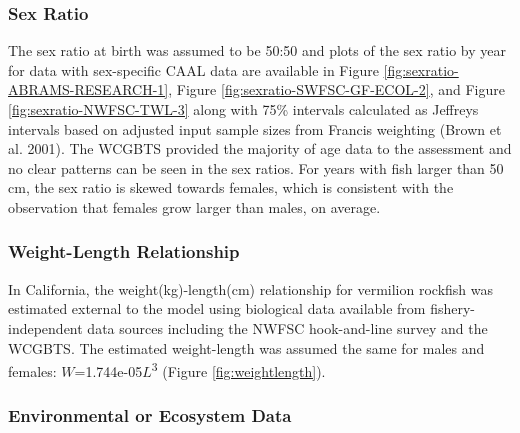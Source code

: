 \documentclass[11pt,
  english,
]{article}
\begin{document}

\hypertarget{sex-ratio}{%
\subsubsection{Sex Ratio}\label{sex-ratio}}

\leavevmode\tagmcend\tagstructend

The sex ratio at birth was assumed to be 50:50 and plots of the sex ratio by year for data with sex-specific CAAL data are available in Figure \ref{fig:sexratio-ABRAMS-RESEARCH-1}, Figure \ref{fig:sexratio-SWFSC-GF-ECOL-2}, and Figure \ref{fig:sexratio-NWFSC-TWL-3} along with 75\% intervals calculated as Jeffreys intervals based on adjusted input sample sizes from Francis weighting {(Brown et al. 2001)\leavevmode\tagmcend\tagstructend}. The WCGBTS provided the majority of age data to the assessment and no clear patterns can be seen in the sex ratios. For years with fish larger than 50 cm, the sex ratio is skewed towards females, which is consistent with the observation that females grow larger than males, on average.


\hypertarget{weight-length-relationship}{%
\subsubsection{Weight-Length Relationship}\label{weight-length-relationship}}

\leavevmode\tagmcend\tagstructend

In California, the weight(kg)-length(cm) relationship for vermilion rockfish was estimated external to the model using biological data available from fishery-independent data sources including the NWFSC hook-and-line survey and the WCGBTS. The estimated weight-length was assumed the same for males and females: {\(W\)\leavevmode\tagmcend\tagstructend}=1.744e-05{\(L\)\leavevmode\tagmcend\tagstructend}\textsuperscript{3} (Figure \ref{fig:weightlength}).


\hypertarget{environmental-or-ecosystem-data}{%
\subsubsection{Environmental or Ecosystem Data}\label{environmental-or-ecosystem-data}}
\end{document}
